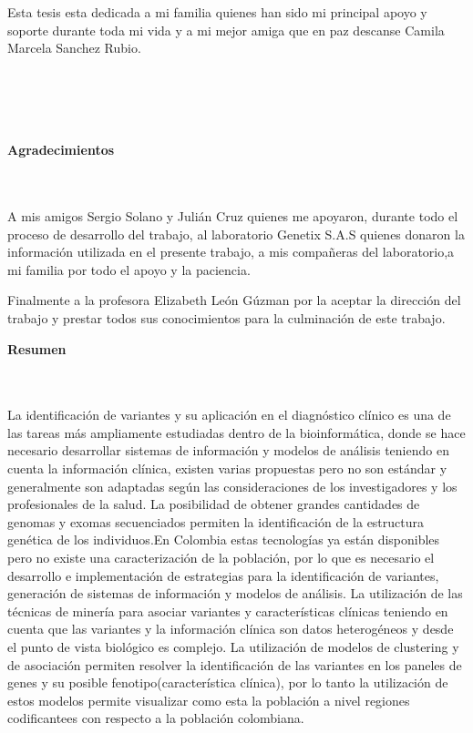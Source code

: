 \begin{flushright}
\begin{minipage}{8cm}
    \noindent
        Esta tesis esta dedicada a mi familia quienes han sido mi principal apoyo y soporte durante toda mi vida y a mi mejor amiga que en paz descanse Camila Marcela Sanchez Rubio.\\[1.0cm]\\
      \end{minipage}
\end{flushright}

\newpage{\pagestyle{empty}\cleardoublepage}

\newpage
\thispagestyle{empty} \textbf{}\normalsize
\\\\\\%
\textbf{\LARGE Agradecimientos}
\\\\
A mis amigos Sergio Solano y Julián Cruz quienes me apoyaron, durante todo el proceso de desarrollo del trabajo, al laboratorio Genetix S.A.S quienes donaron la información utilizada en el presente trabajo, a mis compañeras del laboratorio,a mi familia por todo el apoyo y la paciencia.

Finalmente a la profesora Elizabeth León Gúzman por la aceptar la dirección del trabajo y prestar todos sus conocimientos para la culminación de este trabajo. \\

\newpage{\pagestyle{empty}\cleardoublepage}

\newpage
\textbf{\LARGE Resumen}
\\\\
La identificación de variantes y su aplicación en el diagnóstico clínico es una de las tareas más ampliamente estudiadas dentro de la bioinformática, donde se hace necesario desarrollar sistemas de información y modelos de análisis teniendo en cuenta la información clínica, existen varias propuestas pero no son estándar  y generalmente son adaptadas según las consideraciones de los investigadores y los profesionales de la salud. La posibilidad de obtener grandes cantidades de genomas y exomas secuenciados permiten la identificación de la estructura genética de los individuos.En Colombia estas tecnologías ya están disponibles pero no existe una caracterización de la población, por lo que es necesario el desarrollo e implementación de estrategias para  la identificación de variantes, generación de sistemas de información y modelos de análisis. La utilización de las técnicas de minería para asociar variantes y características clínicas teniendo en cuenta que las variantes y la información clínica son datos heterogéneos y desde el punto de vista biológico es complejo. La utilización de modelos de clustering y de asociación permiten resolver la identificación de las variantes en los paneles de genes y su posible fenotipo(característica clínica), por lo tanto la utilización de estos modelos permite visualizar como esta la población a nivel regiones codificantees con respecto a la población colombiana.   \\

